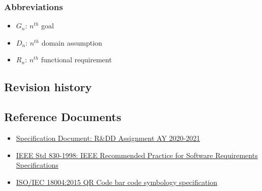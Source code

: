\subsubsection{Abbreviations}
\begin{itemize}
    \item \textbf{$G_n$}: $n^{th}$ goal
    \item \textbf{$D_n$}: $n^{th}$ domain assumption
    \item \textbf{$R_n$}: $n^{th}$ functional requirement
\end{itemize}
\subsection{Revision history}


\subsection{Reference Documents}
\begin{itemize}
    \item \href{https://beep.metid.polimi.it/documents/121843524/23d1869d-ab17-4e36-979e-f1ccbc59be24}{Specification Document: R\&DD Assignment AY 2020-2021}
    \item \href{https://standards.ieee.org/standard/29148-2011.html}{IEEE Std 830-1998: IEEE Recommended Practice for Software Requirements Specifications} %
    \item \href{https://www.iso.org/standard/62021.html}{ISO/IEC 18004:2015 QR Code bar code symbology specification}
\end{itemize}


